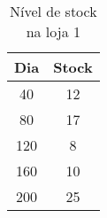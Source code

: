 \begin{table}[htpb]
\begin{center}
\begin{tabular}{cc}
\toprule
Dia & Stock	 	\\ \midrule
40 & 12                 \\ 
80 & 17                 \\ 
120 & 8                 \\ 
160 & 10                \\ 
200 & 25     		\\ 
\bottomrule
\end{tabular}
\end{center}
\caption{Nível de stock na loja 1}
\label{tab:tabela2}
\end{table}

